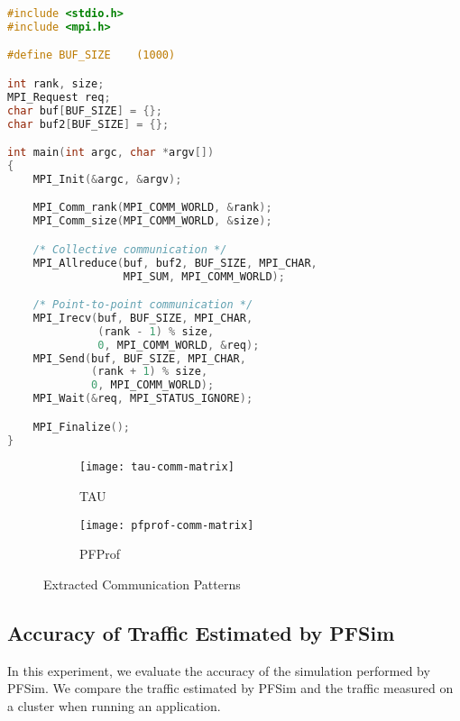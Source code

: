 \begin{lstlisting}[caption={MPI Application Used for Evaluation},
                   label=lst:pfprof-example, float, language=C]
#include <stdio.h>
#include <mpi.h>

#define BUF_SIZE    (1000)

int rank, size;
MPI_Request req;
char buf[BUF_SIZE] = {};
char buf2[BUF_SIZE] = {};

int main(int argc, char *argv[])
{
    MPI_Init(&argc, &argv);

    MPI_Comm_rank(MPI_COMM_WORLD, &rank);
    MPI_Comm_size(MPI_COMM_WORLD, &size);

    /* Collective communication */
    MPI_Allreduce(buf, buf2, BUF_SIZE, MPI_CHAR,
                  MPI_SUM, MPI_COMM_WORLD);

    /* Point-to-point communication */
    MPI_Irecv(buf, BUF_SIZE, MPI_CHAR,
              (rank - 1) % size,
              0, MPI_COMM_WORLD, &req);
    MPI_Send(buf, BUF_SIZE, MPI_CHAR,
             (rank + 1) % size,
             0, MPI_COMM_WORLD);
    MPI_Wait(&req, MPI_STATUS_IGNORE);

    MPI_Finalize();
}
\end{lstlisting}


\begin{figure}
    \centering
    \begin{subfigure}{.49\linewidth}
        \centering
        \texttt{[image: tau-comm-matrix]}
        \caption{TAU}%
        \label{fig:tau-comm-matrix}
    \end{subfigure}
    \begin{subfigure}{.49\linewidth}
        \centering
        \texttt{[image: pfprof-comm-matrix]}
        \caption{PFProf}%
        \label{fig:pfprof-comm-matrix}
    \end{subfigure}
    \caption{Extracted Communication Patterns}%
    \label{fig:profiler-comparison}
\end{figure}

\subsection{Accuracy of Traffic Estimated by PFSim}%
\label{sec:ii-eval-pfsim}

In this experiment, we evaluate the accuracy of the simulation performed by
PFSim. We compare the traffic estimated by PFSim and the traffic measured
on a cluster when running an application.

